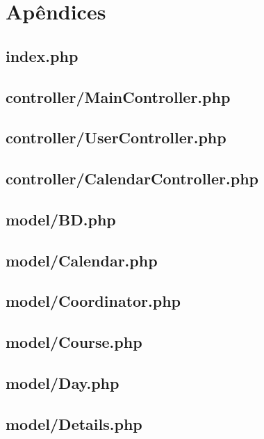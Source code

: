 \chapter{Apêndices}
\section{index.php}


\section{controller/MainController.php}

\section{controller/UserController.php}

\section{controller/CalendarController.php}



\section{model/BD.php}

\section{model/Calendar.php}

\section{model/Coordinator.php}

\section{model/Course.php}

\section{model/Day.php}

\section{model/Details.php}

